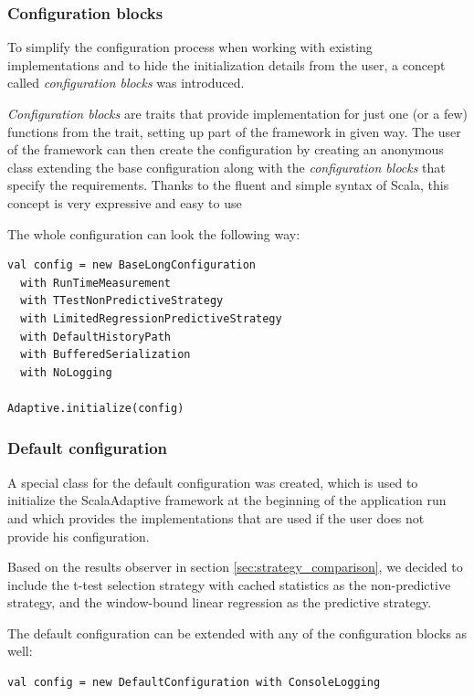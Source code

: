 \subsubsection{Configuration blocks}
 To simplify the configuration process when working with existing implementations and to hide the initialization details from the user, a concept called \textit{configuration blocks} was introduced. 
 
 \textit{Configuration blocks} are traits that provide implementation for just one (or a few) functions from the  trait, setting up part of the framework in given way. The user of the framework can then create the configuration by creating an anonymous class extending the base configuration along with the \textit{configuration blocks} that specify the requirements. Thanks to the fluent and simple syntax of Scala, this concept is very expressive and easy to use
 
 The whole configuration can look the following way:

\lstset{style=Scala}
\begin{lstlisting}
val config = new BaseLongConfiguration
  with RunTimeMeasurement
  with TTestNonPredictiveStrategy
  with LimitedRegressionPredictiveStrategy
  with DefaultHistoryPath
  with BufferedSerialization
  with NoLogging

Adaptive.initialize(config)
\end{lstlisting}

\subsubsection{Default configuration}

A special class for the default configuration was created, which is used to initialize the ScalaAdaptive framework at the beginning of the application run and which provides the implementations that are used if the user does not provide his configuration.

Based on the results observer in section \ref{sec:strategy_comparison}, we decided to include the t-test selection strategy with cached statistics as the non-predictive strategy, and the window-bound linear regression as the predictive strategy.

The default configuration can be extended with any of the configuration blocks as well:

\lstset{style=Scala}
\begin{lstlisting}
val config = new DefaultConfiguration with ConsoleLogging
\end{lstlisting}

